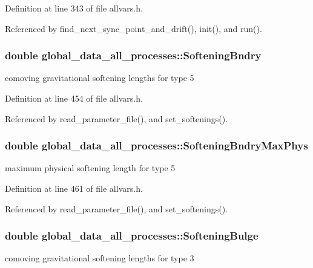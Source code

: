 Definition at line 343 of file allvars.h.



Referenced by find\_\-next\_\-sync\_\-point\_\-and\_\-drift(), init(), and run().

\hypertarget{structglobal__data__all__processes_a8c31c4a347bca34b4e8d2292f710596d}{
\subsubsection[{SofteningBndry}]{\setlength{\rightskip}{0pt plus 5cm}double {\bf global\_\-data\_\-all\_\-processes::SofteningBndry}}}
\label{structglobal__data__all__processes_a8c31c4a347bca34b4e8d2292f710596d}
comoving gravitational softening lengths for type 5 

Definition at line 454 of file allvars.h.



Referenced by read\_\-parameter\_\-file(), and set\_\-softenings().

\hypertarget{structglobal__data__all__processes_af989ac3052ad7e6bf7d7bfc824274715}{
\subsubsection[{SofteningBndryMaxPhys}]{\setlength{\rightskip}{0pt plus 5cm}double {\bf global\_\-data\_\-all\_\-processes::SofteningBndryMaxPhys}}}
\label{structglobal__data__all__processes_af989ac3052ad7e6bf7d7bfc824274715}
maximum physical softening length for type 5 

Definition at line 461 of file allvars.h.



Referenced by read\_\-parameter\_\-file(), and set\_\-softenings().

\hypertarget{structglobal__data__all__processes_a1a0c9ca2f3dfdb2371785b66ced141d7}{
\subsubsection[{SofteningBulge}]{\setlength{\rightskip}{0pt plus 5cm}double {\bf global\_\-data\_\-all\_\-processes::SofteningBulge}}}
\label{structglobal__data__all__processes_a1a0c9ca2f3dfdb2371785b66ced141d7}
comoving gravitational softening lengths for type 3 

